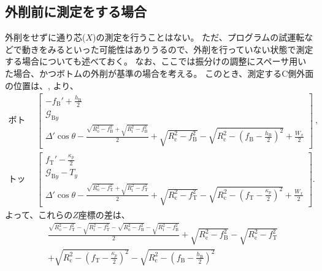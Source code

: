 \subsection{外削前に測定をする場合}
外削をせずに通り芯($X$)の測定を行うことはない。
ただ、プログラムの試運転などで動きをみるといった可能性はありうるので、外削を行っていない状態で測定する場合についても述べておく。
なお、ここでは振分けの調整にスペーサ用いた場合、かつボトムの外削が基準の場合を考える。
このとき、測定するC側外面の位置は、, より、
\begin{align*}
  \text{ボトム側：}&~~
  \left[
    \begin{array}{c}
      \displaystyle -f_\mathrm B'+\frac{h_\mathrm B}2\\[5pt]
      \mathcal G_{\mathrm By}\\[3pt]
      \displaystyle
      \varDelta'\cos\theta-\frac{\sqrt{R_\mathrm o^2-f_\mathrm B^2}+\sqrt{R_\mathrm i^2-f_\mathrm B^2}}2
      +\sqrt{R_\mathrm c^2-f_\mathrm B^2}
      -\sqrt{R_\mathrm c^2-\left(f_\mathrm B-\frac{h_\mathrm B}2\right)^2}
      +\frac{W_x}2
    \end{array}
    \right]~,\\
  \text{トップ側：}&~~
  \left[
    \begin{array}{c}
      \displaystyle f_\mathrm T'-\frac{\kappa_p}2\\[5pt]
      \mathcal G_{\mathrm By}-T_y\\[3pt]
      \displaystyle
      \varDelta'\cos\theta-\frac{\sqrt{R_\mathrm o^2-f_\mathrm T^2}+\sqrt{R_\mathrm i^2-f_\mathrm T^2}}2
      +\sqrt{R_\mathrm c^2-f_\mathrm T^2}
      -\sqrt{R_\mathrm c^2-\left(f_\mathrm T-\frac{\kappa_p}2\right)^2}
      +\frac{W_x}2
    \end{array}
  \right].
\end{align*}
よって、これらの$Z$座標の差は、
\begin{align*}
 &\frac{\sqrt{R_\mathrm o^2-f_\mathrm T^2}-\sqrt{R_\mathrm i^2-f_\mathrm T^2}
         -\sqrt{R_\mathrm o^2-f_\mathrm B^2}-\sqrt{R_\mathrm i^2-f_\mathrm B^2}}2
  +\sqrt{R_\mathrm c^2-f_\mathrm B^2}-\sqrt{R_\mathrm c^2-f_\mathrm T^2}\\
 &+\sqrt{R_\mathrm c^2-\left(f_\mathrm T-\frac{\kappa_p}2\right)^2}
  -\sqrt{R_\mathrm c^2-\left(f_\mathrm B-\frac{h_\mathrm B}2\right)^2}
\end{align*}




